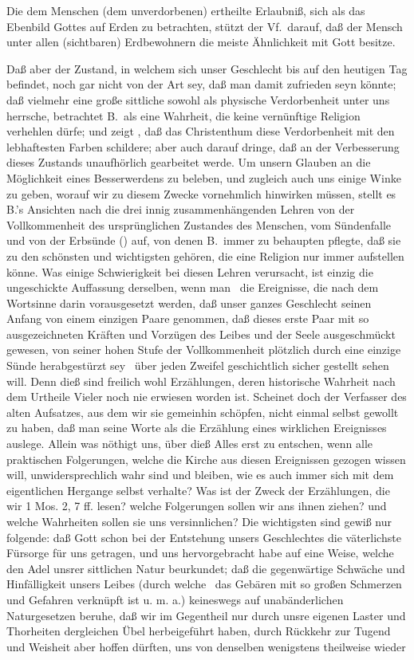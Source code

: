 Die dem Menschen (dem unverdorbenen) ertheilte Erlaubniß, sich als das Ebenbild Gottes auf Erden zu betrachten, stützt der Vf.\ darauf, daß der Mensch unter allen (sichtbaren) Erdbewohnern die meiste Ähnlichkeit mit Gott besitze. \par
Daß aber der Zustand, in welchem sich unser Geschlecht bis auf den heutigen Tag befindet, noch gar nicht von der Art sey, daß man damit zufrieden seyn könnte; daß vielmehr eine große sittliche sowohl als physische Verdorbenheit unter uns herrsche, betrachtet B.\ als eine Wahrheit, die keine vernünftige Religion verhehlen dürfe; und zeigt , daß das Christenthum diese Verdorbenheit mit den lebhaftesten Farben schildere; aber auch darauf dringe, daß an der Verbesserung dieses Zustands unaufhörlich gearbeitet werde. Um unsern Glauben an die Möglichkeit eines Besserwerdens zu beleben, und zugleich auch uns einige Winke zu geben, worauf  wir zu diesem Zwecke vornehmlich hinwirken müssen, stellt es B.'s Ansichten nach die drei innig zusammenhängenden Lehren von der Vollkommenheit des ursprünglichen Zustandes des Menschen, vom Sündenfalle und von der Erbsünde () auf, von denen B.\ immer zu behaupten pflegte, daß sie zu den schönsten und wichtigsten gehören, die eine Religion nur immer aufstellen könne. Was einige Schwierigkeit bei diesen Lehren verursacht, ist einzig die ungeschickte Auffassung derselben, wenn man \zB\ die Ereignisse, die nach dem Wortsinne darin vorausgesetzt werden, daß unser ganzes Geschlecht seinen Anfang von einem einzigen Paare genommen, daß dieses erste Paar mit so ausgezeichneten Kräften und Vorzügen des Leibes und der Seele ausgeschmückt gewesen, von seiner hohen Stufe der Vollkommenheit plötzlich durch eine einzige Sünde herabgestürzt sey \usw\, über jeden Zweifel geschichtlich sicher gestellt sehen will. Denn dieß sind freilich wohl Erzählungen, deren historische Wahrheit nach dem Urtheile Vieler noch nie erwiesen worden ist. Scheinet doch der Verfasser des alten Aufsatzes, aus dem wir sie gemeinhin schöpfen, nicht einmal selbst gewollt zu haben, daß man seine Worte als die Erzählung eines wirklichen Ereignisses auslege. Allein was nöthigt uns, über dieß Alles erst zu entschen, wenn alle praktischen Folgerungen, welche die Kirche aus diesen Ereignissen gezogen wissen will, unwidersprechlich wahr sind und bleiben, wie es auch immer sich mit dem eigentlichen Hergange selbst verhalte? Was ist der Zweck der Erzählungen, die wir 1 Mos. 2, 7 ff. lesen? welche Folgerungen sollen wir ans ihnen ziehen? und welche Wahrheiten sollen sie uns versinnlichen? Die wichtigsten sind gewiß nur folgende: daß Gott schon bei der Entstehung unsers Geschlechtes die väterlichste Fürsorge für uns getragen, und uns hervorgebracht habe auf eine Weise, welche den Adel unsrer sittlichen Natur beurkundet; daß die gegenwärtige Schwäche und Hinfälligkeit unsers Leibes (durch welche \zB\ das Gebären mit so großen Schmerzen und Gefahren verknüpft ist u. m. a.) keineswegs auf unabänderlichen Naturgesetzen beruhe, daß wir im Gegentheil nur durch unsre eigenen Laster und Thorheiten dergleichen Übel herbeigeführt  haben, durch Rückkehr zur Tugend und Weisheit aber hoffen dürften, uns von denselben wenigstens theilweise wieder 